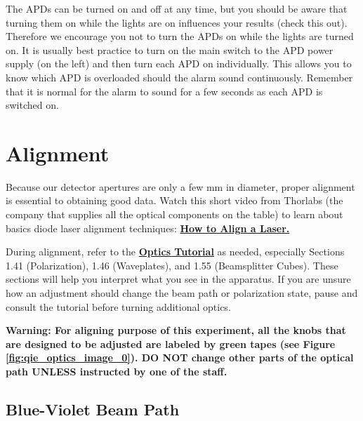 \documentclass{../lab}
\begin{document}
The APDs can be turned on and off at any time, but you should be aware that turning them on while the lights are on influences your results (check this out). Therefore we encourage you not to turn the APDs on while the lights are turned on. It is usually best practice to turn on the main switch to the APD power supply (on the left) and then turn each APD on individually. This allows you to know which APD is overloaded should the alarm sound continuously. Remember that it is normal for the alarm to sound for a few seconds as each APD is switched on.

\section{Alignment}
\label{sec:Alignment}

Because our detector apertures are only a few mm in diameter, proper alignment is essential to obtaining good data. Watch this short video from Thorlabs (the company that supplies all the optical components on the table) to learn about basics diode laser alignment techniques: \href{https://www.youtube.com/watch?v=qzxILY6nOmA&themeRefresh=1}{\textbf{How to Align a Laser.}}

During alignment, refer to the \href{https://berkeley-physics111b.github.io/assets/pdf/oldwebsitestructure/QIE/fundamental-Optics.pdf}{\textbf{Optics Tutorial}} as needed, especially Sections 1.41 (Polarization), 1.46 (Waveplates), and 1.55 (Beamsplitter Cubes). These sections will help you interpret what you see in the apparatus. If you are unsure how an adjustment should change the beam path or polarization state, pause and consult the tutorial before turning additional optics.

\textbf{Warning: For aligning purpose of this experiment, all the knobs that are designed to be adjusted are labeled by green tapes (see Figure \ref{fig:qie_optics_image_0}). DO NOT change other parts of the optical path UNLESS instructed by one of the staff.}


\subsection{Blue-Violet Beam Path}

\end{document}
